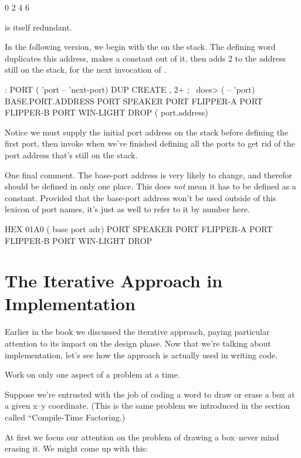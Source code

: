 \medskip

0 2 4 6

\medskip

\noindent
is itself redundant.

In the following version, we begin with the 
on the stack. The defining word  duplicates this address,
makes a constant out of it, then adds 2 to the address still on the
stack, for the next invocation of .

\begin{Code}
: PORT   ( 'port -- 'next-port)  DUP CREATE ,  2+ ;
   \ does>  ( -- 'port)
BASE.PORT.ADDRESS
  PORT SPEAKER
  PORT FLIPPER-A
  PORT FLIPPER-B
  PORT WIN-LIGHT
DROP ( port.address)
\end{Code}
Notice we must supply the initial port address on the stack before
defining the first port, then invoke  when we've finished
defining all the ports to get rid of the port address that's still on
the stack.

One final comment. The base-port address is very likely to change, and
therefor should be defined in only one place. This does \emph{not}
mean it has to be defined as a constant. Provided that the base-port
address won't be used outside of this lexicon of port names, it's just
as well to refer to it by number here.

\begin{Code}
HEX 01A0  ( base port adr)
  PORT SPEAKER
  PORT FLIPPER-A
  PORT FLIPPER-B
  PORT WIN-LIGHT
DROP
\end{Code}

\section{The Iterative Approach in Implementation}
Earlier in the book we discussed the iterative approach, paying
particular attention to its impact on the design phase. Now that we're
talking about implementation, let's see how the approach is actually
used in writing code.

\begin{tip}
Work on only one aspect of a problem at a time.
\end{tip}
Suppose we're entrusted with the job of coding a word to draw or erase
a box at a given x--y coordinate. (This is the same problem we
introduced in the section called ``Compile-Time Factoring.)

At first we focus our attention on the problem of drawing a
box--never mind erasing it. We might come up with this:

